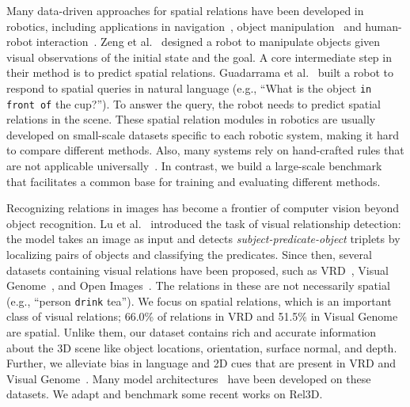 \documentclass{article}
\newcommand{\smallsec}[1]{\noindent {\bf #1.}}
\newcommand\datasetname{Rel3D}
\begin{document}
Many data-driven approaches for spatial relations have been developed in robotics, including applications in navigation~\cite{boularias2015grounding}, object manipulation~\cite{zampogiannis2015learning,rosman2011learning,zeng2018semantic} and human-robot interaction~\cite{skubic2004spatial,moratz2006spatial,guadarrama2013grounding,tan2014grounding,shridhar2017grounding}. Zeng et al.~\cite{zeng2018semantic} designed a robot to manipulate objects given visual observations of the initial state and the goal. A core intermediate step in their method is to predict spatial relations. Guadarrama et al.~\cite{guadarrama2013grounding} built a robot to respond to spatial queries in natural language (e.g., ``What is the object \texttt{in front of} the cup?''). To answer the query, the robot needs to predict spatial relations in the scene. These spatial relation modules in robotics are usually developed on small-scale datasets specific to each robotic system, making it hard to compare different methods. Also, many systems rely on hand-crafted rules that are not applicable universally~\cite{skubic2004spatial,moratz2006spatial,zeng2018semantic}. In contrast, we build a large-scale benchmark that facilitates a common base for training and evaluating different methods. 

\smallsec{Visual relationship detection} Recognizing relations in images has become a frontier of computer vision beyond object recognition. Lu et al.~\cite{lu2016visual} introduced the task of visual relationship detection: the model takes an image as input and detects \emph{subject-predicate-object} triplets by localizing pairs of objects and classifying the predicates. Since then, several datasets containing visual relations have been proposed, such as VRD~\cite{lu2016visual}, Visual Genome~\cite{krishna2016visual}, and Open Images~\cite{OpenImages}. The relations in these are not necessarily spatial (e.g., ``person \texttt{drink} tea''). We focus on spatial relations, which is an important class of visual relations; 66.0\% of relations in VRD and 51.5\% in Visual Genome are spatial. Unlike them, our dataset contains rich and accurate information about the 3D scene like object locations, orientation, surface normal, and depth. Further, we alleviate bias in language and 2D cues that are present in VRD and Visual Genome~\cite{yang2019spatialsense}.  Many model architectures~\cite{li2017vip,Zhang_2017_CVPR,liang2017deep,dai2017detecting,zhuang2017towards,Yu_2017_ICCV,Peyre_2017_ICCV,Zhang_2017_ICCV,yang2018shuffle} have been developed on these datasets. We adapt and benchmark some recent works on \datasetname.
\end{document}
